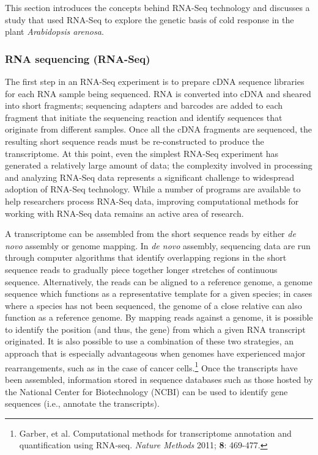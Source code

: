 This section introduces the concepts behind RNA-Seq technology and discusses a study that used RNA-Seq to explore the genetic basis of cold response in the plant \textit{Arabidopsis arenosa}.

\subsubsection{RNA sequencing (RNA-Seq)}

The first step in an RNA-Seq experiment is to prepare cDNA sequence libraries for each RNA sample being sequenced. RNA is converted into cDNA and sheared into short fragments; sequencing adapters and barcodes are added to each fragment that initiate the sequencing reaction and identify sequences that originate from different samples. Once all the cDNA fragments are sequenced, the resulting short sequence reads must be re-constructed to produce the transcriptome. At this point, even the simplest RNA-Seq experiment has generated a relatively large amount of data; the complexity involved in processing and analyzing RNA-Seq data represents a significant challenge to widespread adoption of RNA-Seq technology. While a number of programs are available to help researchers process RNA-Seq data, improving computational methods for working with RNA-Seq data remains an active area of research.

A transcriptome can be assembled from the short sequence reads by either \textit{de novo} assembly or genome mapping. In \textit{de novo} assembly, sequencing data are run through computer algorithms that identify overlapping regions in the short sequence reads to gradually piece together longer stretches of continuous sequence.  Alternatively, the reads can be aligned to a reference genome, a genome sequence which functions as a representative template for a given species; in cases where a species has not been sequenced, the genome of a close relative can also function as a reference genome. By mapping reads against a genome, it is possible to identify the position (and thus, the gene) from which a given RNA transcript originated. It is also possible to use a combination of these two strategies, an approach that is especially advantageous when genomes have experienced major rearrangements, such as in the case of cancer cells.\footnote{Garber, et al. Computational methods for transcriptome annotation and quantification using RNA-seq. \textit{Nature Methods} 2011; \textbf{8}: 469-477.} Once the transcripts have been assembled, information stored in sequence databases such as those hosted by the National Center for Biotechnology (NCBI) can be used to identify gene sequences (i.e., annotate the transcripts).

